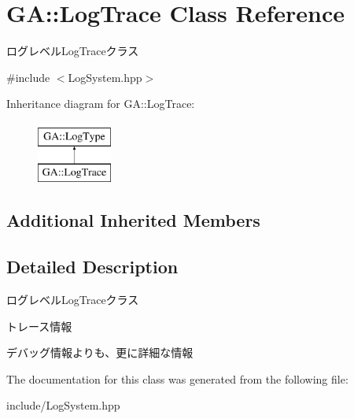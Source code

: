 \hypertarget{class_g_a_1_1_log_trace}{}\section{GA\+::Log\+Trace Class Reference}
\label{class_g_a_1_1_log_trace}


ログレベル\+Log\+Traceクラス  




{\ttfamily \#include $<$Log\+System.\+hpp$>$}

Inheritance diagram for GA\+::Log\+Trace\+:\begin{figure}[H]
\begin{center}
\leavevmode
\includegraphics[height=2.000000cm]{class_g_a_1_1_log_trace}
\end{center}
\end{figure}
\subsection*{Additional Inherited Members}


\subsection{Detailed Description}
ログレベル\+Log\+Traceクラス 

トレース情報

デバッグ情報よりも、更に詳細な情報 

The documentation for this class was generated from the following file\+:\begin{DoxyCompactItemize}
\item 
include/Log\+System.\+hpp\end{DoxyCompactItemize}
